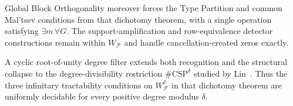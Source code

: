 \documentclass[11pt]{article}
\theoremstyle{plain}
\theoremstyle{definition}
\theoremstyle{remark}
\newcommand{\cF}{\mathcal F}
\begin{document}
Global Block Orthogonality moreover forces the Type Partition and common
Mal'tsev conditions from that dichotomy theorem, with a single operation
satisfying
$\exists m\,\forall G$.  The support-amplification and row-equivalence
detector constructions remain within $W_{\cF}$ and handle
cancellation-created zeros exactly.

A cyclic root-of-unity degree filter extends both recognition and the
structural collapse to the degree-divisibility restriction
$\#\mathrm{CSP}^{\delta}$ studied by Lin~\cite[Definition~2 and
Theorem~3]{Lin2021}.  Thus the three infinitary tractability conditions on
$W_{\cF}^{\delta}$ in that dichotomy theorem are uniformly decidable for every
positive degree modulus $\delta$.



\end{document}
